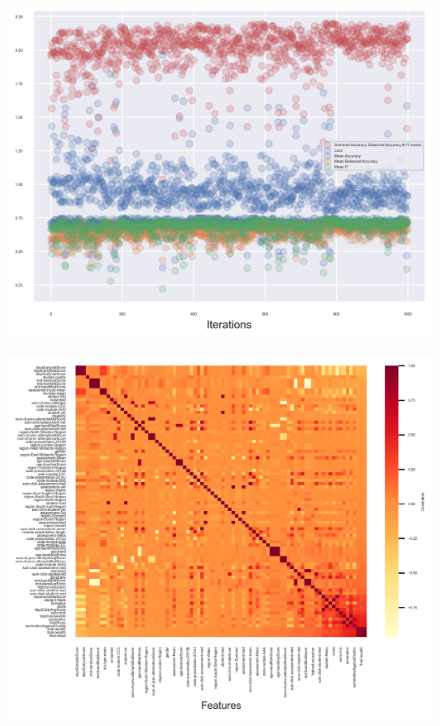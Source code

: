 \documentclass[11pt, a4paper, twocolumn]{article}
\begin{document}
\begin{figure}[h]
	\includegraphics[width=\linewidth]{Accuracy_against_iteration2.png} 
	\label{fig:Acc2}
\end{figure}

\begin{figure}[b]
	\includegraphics[width=2\linewidth]{heatmap.png} 
	\label{fig:Acc2}
\end{figure}
\end{document}

